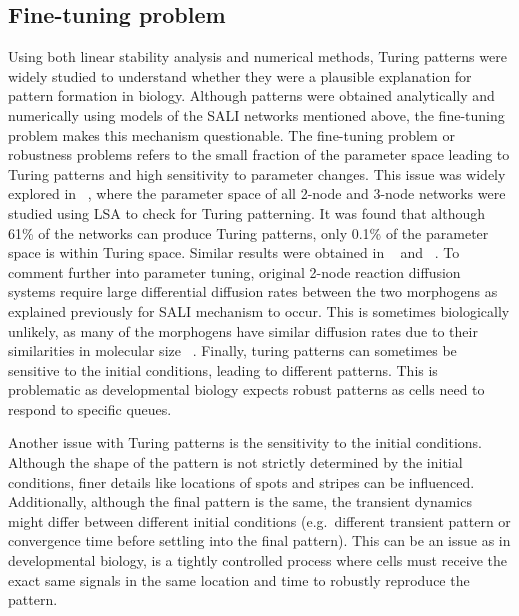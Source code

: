 \subsection{Fine-tuning problem}

Using both linear stability analysis and numerical methods, Turing patterns were widely studied to understand whether they were a plausible explanation for pattern formation in biology.
Although patterns were obtained analytically and numerically using models of the SALI networks mentioned above, the fine-tuning problem makes this mechanism questionable.
The fine-tuning problem or robustness problems refers to the small fraction of the parameter space leading to Turing patterns and high sensitivity to parameter changes.
This issue was widely explored in ~\cite{Scholes2019}, where the parameter space of all 2-node and 3-node networks were studied using LSA to check for Turing patterning.
It was found that although 61\% of the networks can produce Turing patterns, only 0.1\% of the parameter space is within Turing space.
Similar results were obtained in ~\cite{Zheng2016} and ~\cite{Marcon}.
To comment further into parameter tuning, original 2-node reaction diffusion systems require large differential diffusion rates between the two morphogens as explained previously for SALI mechanism to occur.
This is sometimes biologically unlikely, as many of the morphogens have similar diffusion rates due to their similarities in molecular size ~\parencite{huidobro}.
Finally, turing patterns can sometimes be sensitive to the initial conditions, leading to different patterns.
This is problematic as developmental biology expects robust patterns as cells need to respond to specific queues.   %

Another issue with Turing patterns is the sensitivity to the initial conditions.
Although the shape of the pattern is not strictly determined by the initial conditions, finer details like locations of spots and stripes can be influenced.
Additionally, although the final pattern is the same, the transient dynamics might differ between different initial conditions (e.g.\ different transient pattern or convergence time before settling into the final pattern).
This can be an issue as in developmental biology, is a tightly controlled process where cells must receive the exact same signals in the same location and time to robustly reproduce the pattern. %





